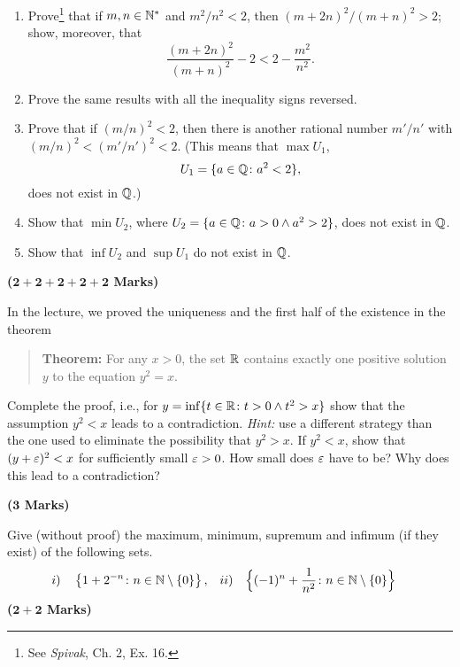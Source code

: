 \documentclass[a4paper]{article}
\begin{document}
\begin{Exercise}
\label{sqrttwo.ex}
\par\indent\vspace*{0cm}
\begin{enumerate}
	\item Prove\footnote{See \emph{Spivak}, Ch. 2, Ex. 16.} that if $m,n\in\mathbb{N}^*$ and $m^2/n^2<2$, then $(m+2n)^2/(m+n)^2>2$; 
	show, moreover, that
	\[
	\frac{(m+2n)^2}{(m+n)^2}-2<2-\frac{m^2}{n^2}.
	\]
	\item Prove the same results with all the inequality signs reversed.
	\item Prove that if $(m/n)^2<2$, then there is another rational number 
	$m'/n'$ with $(m/n)^2<(m'/n')^2<2$. (This means that $\max U_1$, 
	\[
	U_1=\{a\in\mathbb{Q}\colon a^2<2\},
	\]
	does not exist in $\mathbb{Q}$.)
	\item Show that $\min U_2$, where $U_2=\{a\in\mathbb{Q}\colon a>0\mathbin{\land} a^2>2\}$, does not exist in $\mathbb{Q}$.
	\item Show that $\inf U_2$ and $\sup U_1$ do not exist in $\mathbb{Q}$.
\end{enumerate}
\textbf{($\boldsymbol{2+2+2+2+2}$ Marks)}
\end{Exercise}

\begin{Exercise}
In the lecture, we proved the uniqueness and the first half of the existence in the theorem
\begin{quote}
	\textbf{Theorem:} For any $x>0$, the set $\mathbb{R}$ contains exactly one positive solution $y$ to the equation $y^2=x$. 
\end{quote}
Complete the proof, i.e., for $y=\inf\{t\in\mathbb{R}\colon t>0\land t^2>x\}$ 
show that the assumption $y^2<x$ leads to a contradiction. \emph{Hint:} use a different strategy than 
the one used to eliminate the possibility that $y^2>x$. If $y^2<x$, show that $(y+\varepsilon)^2<x$ for sufficiently 
small $\varepsilon>0$. How small does $\varepsilon$ have to be? Why does this lead to a contradiction? \par
\textbf{($\boldsymbol{3}$ Marks)}
\end{Exercise}

\begin{Exercise}
Give (without proof) the maximum, minimum, supremum and infimum (if they exist) of the following sets.
\begin{align*}
i)\quad& \left\{ 1+2^{-n}\colon n\in \mathbb{N}\setminus\{0\}\right\}, &
ii)\quad& %
\Bigl\{ (-1)^n+\frac{1}{n^2}\colon n\in \mathbb{N}\setminus\{0\}\Bigr\}
\end{align*}
\textbf{($\boldsymbol{2+2}$ Marks)}
\end{Exercise}
\end{document}
